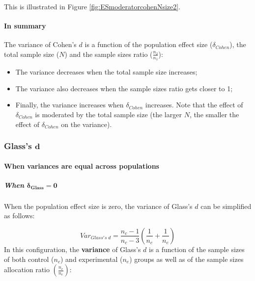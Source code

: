 \documentclass[
  english,
  man,mask]{apa6}
\providecommand{\tightlist}{%
  \setlength{\itemsep}{0pt}\setlength{\parskip}{0pt}}
\let\oldparagraph\paragraph
\renewcommand{\paragraph}[1]{\oldparagraph{#1}\mbox{}}
\let\oldsubparagraph\subparagraph
\renewcommand{\subparagraph}[1]{\oldsubparagraph{#1}\mbox{}}
\begin{document}
This is illustrated in Figure \ref{fig:ESmoderatorcohenNsize2}.

\hypertarget{in-summary-1}{%
\paragraph{In summary}\label{in-summary-1}}

The variance of Cohen's \(d\) is a function of the population effect size (\(\delta_{Cohen}\)), the total sample size (\(N\)) and the sample sizes ratio (\(\frac{n_2}{n_1}\)):

\begin{itemize}
\tightlist
\item
  The variance decreases when the total sample size increases;\\
\item
  The variance also decreases when the sample sizes ratio gets closer to 1;\\
\item
  Finally, the variance increases when \(\delta_{Cohen}\) increases. Note that the effect of \(\delta_{Cohen}\) is moderated by the total sample size (the larger \(N\), the smaller the effect of \(\delta_{Cohen}\) on the variance).
\end{itemize}

\hypertarget{glasss-bmd}{%
\subsubsection{\texorpdfstring{Glass's \(\bm{d}\)}{Glass's \textbackslash bm\{d\}}}\label{glasss-bmd}}

\hypertarget{when-variances-are-equal-across-populations-3}{%
\paragraph{When variances are equal across populations}\label{when-variances-are-equal-across-populations-3}}

\hypertarget{when-bmdelta_glass0}{%
\subparagraph{\texorpdfstring{When \(\bm{\delta_{Glass}=0}\)}{When \textbackslash bm\{\textbackslash delta\_\{Glass\}=0\}}}\label{when-bmdelta_glass0}}

When the population effect size is zero, the variance of Glass's \(d\) can be simplified as follows:

\[Var_{Glass's \; d} = \frac{n_c-1}{n_c-3} \left( \frac{1}{n_c}+\frac{1}{n_e}\right)\] In this configuration, the \textbf{variance} of Glass's \(d\) is a function of the sample sizes of both control (\(n_c\)) and experimental (\(n_e\)) groups as well as of the sample sizes allocation ratio \(\left( \frac{n_c}{n_e}\right)\):
\end{document}

